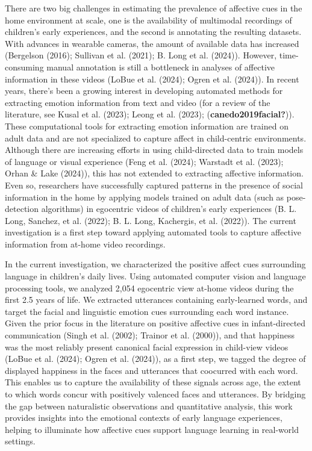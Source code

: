 \documentclass[10pt, letterpaper]{article}
\begin{document}
There are two big challenges in estimating the prevalence of affective
cues in the home environment at scale, one is the availability of
multimodal recordings of children's early experiences, and the second is
annotating the resulting datasets. With advances in wearable cameras,
the amount of available data has increased (Bergelson (2016); Sullivan
et al. (2021); B. Long et al. (2024)). However, time-consuming manual
annotation is still a bottleneck in analyses of affective information in
these videos (LoBue et al. (2024); Ogren et al. (2024)). In recent
years, there's been a growing interest in developing automated methods
for extracting emotion information from text and video (for a review of
the literature, see Kusal et al. (2023); Leong et al. (2023);
(\textbf{canedo2019facial?})). These computational tools for extracting
emotion information are trained on adult data and are not specialized to
capture affect in child-centric environments. Although there are
increasing efforts in using child-directed data to train models of
language or visual experience (Feng et al. (2024); Warstadt et al.
(2023); Orhan \& Lake (2024)), this has not extended to extracting
affective information. Even so, researchers have successfully captured
patterns in the presence of social information in the home by applying
models trained on adult data (such as pose-detection algorithms) in
egocentric videos of children's early experiences (B. L. Long, Sanchez,
et al. (2022); B. L. Long, Kachergis, et al. (2022)). The current
investigation is a first step toward applying automated tools to capture
affective information from at-home video recordings.

In the current investigation, we characterized the positive affect cues
surrounding language in children's daily lives. Using automated computer
vision and language processing tools, we analyzed 2,054 egocentric view
at-home videos during the first 2.5 years of life. We extracted
utterances containing early-learned words, and target the facial and
linguistic emotion cues surrounding each word instance. Given the prior
focus in the literature on positive affective cues in infant-directed
communication (Singh et al. (2002); Trainor et al. (2000)), and that
happiness was the most reliably present canonical facial expression in
child-view videos (LoBue et al. (2024); Ogren et al. (2024)), as a first
step, we tagged the degree of displayed happiness in the faces and
utterances that coocurred with each word. This enables us to capture the
availability of these signals across age, the extent to which words
concur with positively valenced faces and utterances. By bridging the
gap between naturalistic observations and quantitative analysis, this
work provides insights into the emotional contexts of early language
experiences, helping to illuminate how affective cues support language
learning in real-world settings.
\end{document}
